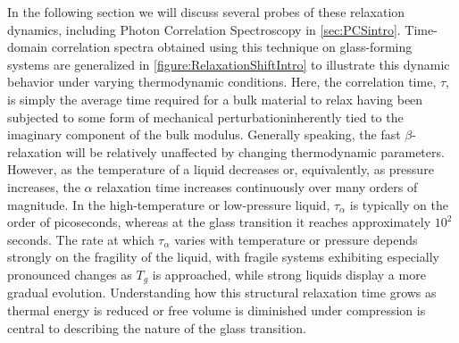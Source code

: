 In the following section we will discuss several probes of these relaxation dynamics, including Photon Correlation Spectroscopy in \sect\nolinebreak \ref{sec:PCSintro}.  Time-domain correlation spectra obtained using this technique on glass-forming systems are generalized in \fig \nolinebreak \ref{figure:RelaxationShiftIntro} to illustrate this dynamic behavior under varying thermodynamic conditions.  Here, the correlation time, $\tau$, is simply the average time required for a bulk material to relax having been subjected to some form of mechanical perturbation\textemdash  inherently tied to the imaginary component of the bulk modulus. Generally speaking, the fast $\beta$-relaxation will be relatively unaffected by changing thermodynamic parameters.  However, as the temperature of a liquid decreases or, equivalently, as pressure increases, the $\alpha$ relaxation time increases continuously over many orders of magnitude. In the high-temperature or low-pressure liquid, $\tau_{\alpha}$ is typically on the order of picoseconds, whereas at the glass transition it reaches approximately $10^{2}$ seconds. The rate at which $\tau_{\alpha}$ varies with temperature or pressure depends strongly on the fragility of the liquid, with fragile systems exhibiting especially pronounced changes as $T_g$ is approached, while strong liquids display a more gradual evolution.  Understanding how this structural relaxation time grows as thermal energy is reduced or free volume is diminished under compression is central to describing the nature of the glass transition.


